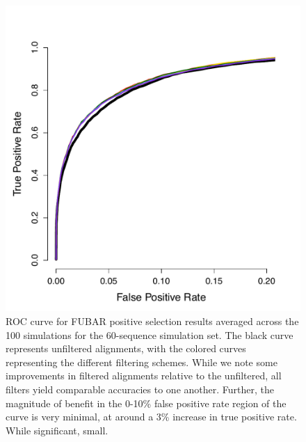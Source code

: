 \documentclass[10pt]{article}
\begin{document}
\begin{figure}[H]
\centerline{\includegraphics[width=5in]{Figures/ROC_fubar_prk.pdf}}
\caption{ROC curve for FUBAR positive selection results averaged across the 100 simulations for the 60-sequence simulation set. The black curve represents unfiltered alignments, with the colored curves representing the different filtering schemes. While we note some improvements in filtered alignments relative to the unfiltered, all filters yield comparable accuracies to one another. Further, the magnitude of benefit in the 0-10\% false positive rate region of the curve is very minimal, at around a 3\% increase in true positive rate. While significant, small. }
\label{rocfubar60} 
\end{figure}




	
\end{document}
